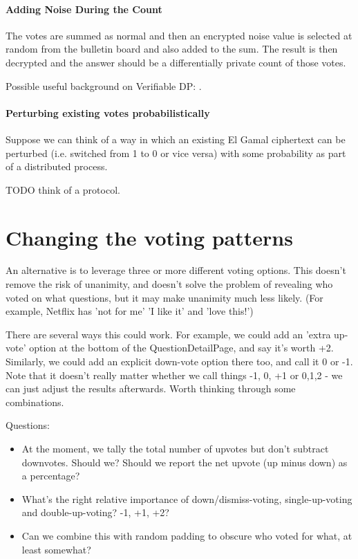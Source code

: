 \documentclass[10pt,a4paper]{article}
\begin{document}
\paragraph{Adding Noise During the Count}

The votes are summed as normal and then an encrypted noise value is selected at random from the bulletin board and also added to the sum. The result is then decrypted and the answer should be a differentially private count of those votes.

Possible useful background on Verifiable DP: \cite{narayan2015verifiable,kato2021preventing}.

\paragraph{Perturbing existing votes probabilistically}

Suppose we can think of a way in which an existing El Gamal ciphertext can be perturbed (i.e. switched from 1 to 0 or vice versa) with some probability as part of a distributed process.

TODO think of a protocol.

\section{Changing the voting patterns}
An alternative is to leverage three or more different voting options. This doesn't remove the risk of unanimity, and doesn't solve the problem of revealing who voted on what questions, but it may make unanimity much less likely. (For example, Netflix has 'not for me' 'I like it' and 'love this!')

There are several ways this could work. For example, we could add an 'extra up-vote' option at the bottom of the QuestionDetailPage, and say it's worth +2. Similarly, we could add an explicit down-vote option there too, and call it 0 or -1.
Note that it doesn't really matter whether we call things -1, 0, +1 or 0,1,2 - we can just adjust the results afterwards. Worth thinking through some combinations.

Questions:
\begin{itemize}
	\item At the moment, we tally the total number of upvotes but don't subtract downvotes. Should we? Should we report the net upvote (up minus down) as a percentage? 
	\item What's the right relative importance of down/dismiss-voting, single-up-voting and double-up-voting? -1, +1, +2?
	\item Can we combine this with random padding to obscure who voted for what, at least somewhat?
\end{itemize}
\end{document}
